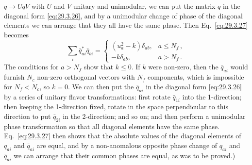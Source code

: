 \(q\longrightarrow UqV\) with \(U\) and \(V\) unitary and unimodular, we
can put the matrix \(q\) in the diagonal form \eqref{eq:29.3.26}, and by a
unimodular change of phase of the diagonal elements we can arrange that
they all have the same phase. Then Eq.~\eqref{eq:29.3.27} becomes
\[
  \sum_i\bar q_{ai}^*\bar q_{bi}
  =
  \begin{cases}
    (u_a^2-k)\delta_{ab}, & a\leq N_f\,,\\
    -k\delta_{ab}, & a>N_f\,.
  \end{cases}
\]
The conditions for \(a>N_f\) show that \(k\leq0\). If \(k\) were
non-zero, then the \(\bar q_{ai}\) would furnish \(N_c\) non-zero
orthogonal vectors with \(N_f\) components, which is impossible for
\(N_f<N_c\), so \(k=0\). We can then put the \(\bar q_{ai}\) in the
diagonal form \eqref{eq:29.3.26} by a series of unitary flavor
transformations: first rotate \(\bar q_{1i}\) into the 1-direction; then
keeping the 1-direction fixed, rotate in the space perpendicular to this
direction to put \(\bar q_{2i}\) in the 2-direction; and so on; and then
perform a unimodular phase transformation so that all diagonal elements
have the same phase. Eq.~\eqref{eq:29.3.27} then shows that the absolute
values of the diagonal elements of \(q_{ai}\) and \(\bar q_{ai}\) are
equal, and by a non-anomalous opposite phase change of \(q_{ai}\) and
\(\bar q_{ai}\) we can arrange that their common phases are equal, as was
to be proved.)

